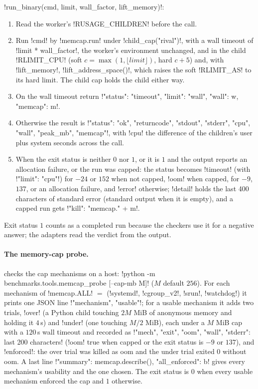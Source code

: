 \begin{algorithm}\label{alg:bench-tools-run-binary}
\py!run_binary(cmd, limit, wall_factor, lift_memory)!:
\begin{enumerate}
\item Read the worker's \py!RUSAGE_CHILDREN! before the call.
\item Run \py!cmd! by \py!memcap.run! under \py!child_cap("rival")!, with a wall timeout of \py!limit * wall_factor!, the worker's environment unchanged, and in the child \py!RLIMIT_CPU! (soft $c=\max(1,\lfloor\mathit{limit}\rfloor)$, hard $c+5$) and, with \py!lift_memory!, \py!lift_address_space()!, which raises the soft \py!RLIMIT_AS! to its hard limit. The child cap holds the child either way.
\item On the wall timeout return \py!{"status": "timeout", "limit": "wall", "wall": w, "memcap": m}!.
\item Otherwise the result is \py!{"status": "ok", "returncode", "stdout", "stderr", "cpu", "wall", "peak_mb", "memcap"}!, with \code!cpu! the difference of the children's user plus system seconds across the call.
\item When the exit status is neither $0$ nor $1$, or it is $1$ and the output reports an allocation failure, or the run was capped: the status becomes \code!timeout! (with \py!"limit": "cpu"!) for $-24$ or $152$ when not capped, \code!oom! when capped, for $-9$, $137$, or an allocation failure, and \code!error! otherwise; \code!detail! holds the last 400 characters of standard error (standard output when it is empty), and a capped run gets \py!"kill": "memcap." + m!.
\end{enumerate}
Exit status $1$ counts as a completed run because the checkers use it for a negative answer; the adapters read the verdict from the output.
\end{algorithm}

\paragraph{The memory-cap probe.}  checks the cap mechanisms on a host: \code!python -m benchmarks.tools.memcap_probe [--cap-mb M]! ($M$ default $256$). For each mechanism of \py!memcap.ALL! $=$ (\code!systemd!, \code!cgroup_v2!, \code!srun!, \code!watchdog!) it prints one JSON line \py!{"mechanism", "usable"}!; for a usable mechanism it adds two trials, \code!over! (a Python child touching $2M$ MiB of anonymous memory and holding it $4$\,s) and \code!under! (one touching $M/2$ MiB), each under a $M$ MiB cap with a $120$\,s wall timeout and recorded as \py!{"mech", "exit", "oom", "wall", "stderr": last 200 characters}! (\code!oom! true when capped or the exit status is $-9$ or $137$), and \code!enforced!: the over trial was killed as oom and the under trial exited $0$ without oom. A last line \py!{"summary": memcap.describe(), "all_enforced": b}! gives every mechanism's usability and the one chosen. The exit status is $0$ when every usable mechanism enforced the cap and $1$ otherwise.

